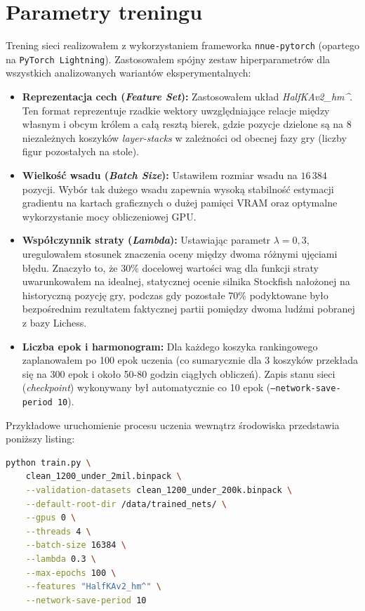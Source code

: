 \documentclass[12pt,a4paper]{report}
\begin{document}
\section{Parametry treningu}

Trening sieci realizowałem z wykorzystaniem frameworka \texttt{nnue-pytorch} (opartego na \texttt{PyTorch Lightning}). Zastosowałem spójny zestaw hiperparametrów dla wszystkich analizowanych wariantów eksperymentalnych:

\begin{itemize}
    \item \textbf{Reprezentacja cech (\textit{Feature Set}):} Zastosowałem układ \textit{HalfKAv2\_hm\string^}. Ten format reprezentuje rzadkie wektory uwzględniające relacje między własnym i obcym królem a całą resztą bierek, gdzie pozycje dzielone są na 8 niezależnych koszyków \textit{layer-stacks} w zależności od obecnej fazy gry (liczby figur pozostałych na stole).
    \item \textbf{Wielkość wsadu (\textit{Batch Size}):} Ustawiłem rozmiar wsadu na $16\,384$ pozycji. Wybór tak dużego wsadu zapewnia wysoką stabilność estymacji gradientu na kartach graficznych o dużej pamięci VRAM oraz optymalne wykorzystanie mocy obliczeniowej GPU.
    \item \textbf{Współczynnik straty (\textit{Lambda}):} Ustawiając parametr $\lambda = 0{,}3$, uregulowałem stosunek znaczenia oceny między dwoma różnymi ujęciami błędu. Znaczyło to, że 30\% docelowej wartości wag dla funkcji straty uwarunkowałem na idealnej, statycznej ocenie silnika Stockfish nałożonej na historyczną pozycję gry, podczas gdy pozostałe 70\% podyktowane było bezpośrednim rezultatem faktycznej partii pomiędzy dwoma ludźmi pobranej z bazy Lichess.
    \item \textbf{Liczba epok i harmonogram:} Dla każdego koszyka rankingowego zaplanowałem po 100 epok uczenia (co sumarycznie dla 3 koszyków przekłada się na 300 epok i około 50-80 godzin ciągłych obliczeń). Zapis stanu sieci (\textit{checkpoint}) wykonywany był automatycznie co 10 epok (\texttt{--network-save-period 10}).
\end{itemize}

Przykładowe uruchomienie procesu uczenia wewnątrz środowiska przedstawia poniższy listing:

\begin{lstlisting}[language=bash, caption=Polecenie uruchamiające proces uczenia na pierwszym koszyku Elo]
python train.py \
    clean_1200_under_2mil.binpack \
    --validation-datasets clean_1200_under_200k.binpack \
    --default-root-dir /data/trained_nets/ \
    --gpus 0 \
    --threads 4 \
    --batch-size 16384 \
    --lambda 0.3 \
    --max-epochs 100 \
    --features "HalfKAv2_hm^" \
    --network-save-period 10
\end{lstlisting}
\end{document}
